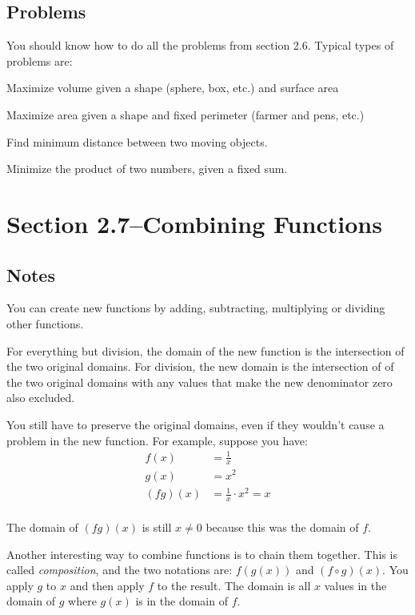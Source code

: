\documentclass{article}
\begin{document}
\subsection{Problems}
You should know how to do all the problems from section 2.6.  Typical types of problems are:
\begin{itemize*}
  \item Maximize volume given a shape (sphere, box, etc.) and surface area
  \item Maximize area given a shape and fixed perimeter (farmer and pens, etc.)
  \item Find minimum distance between two moving objects.
  \item Minimize the product of two numbers, given a fixed sum.
\end{itemize*}

\section{Section 2.7--Combining Functions}

\subsection{Notes}

You can create new functions by adding, subtracting, multiplying or dividing other functions.  

For everything but division, the domain of the new function is the intersection of the two original domains.  For
division, the new domain is the intersection of of the two original domains with any values that make the new
denominator zero also excluded.

You still have to preserve the original domains, even if they wouldn't cause a problem in the new function.  For
example, suppose you have:
\begin{align*}
  f(x) &= \frac{1}{x} \\
  g(x) &= x^2 \\
  (fg)(x) &= \frac{1}{x} \cdot x^2 = x \\
\end{align*}

The domain of $(fg)(x)$ is still $x \neq 0$ because this was the domain of $f$.

Another interesting way to combine functions is to chain them together.  This is called {\em composition}, and the two
notations are: $f(g(x))$ and $(f \circ g)(x)$.  You apply $g$ to $x$ and then apply $f$ to the result.  The domain is
all $x$ values in the domain of $g$ where $g(x)$ is in the domain of $f$.
\end{document}
